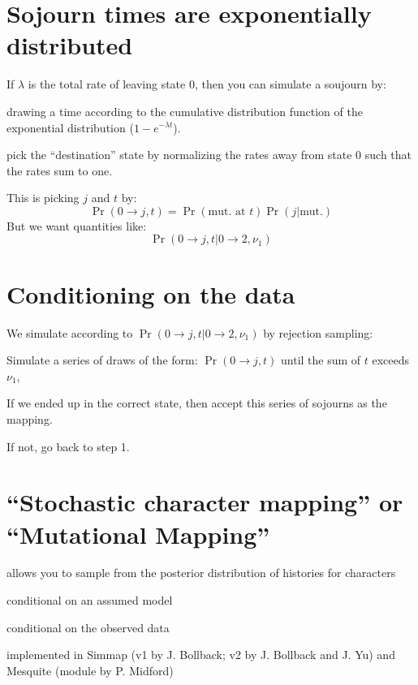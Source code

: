\documentclass[landscape]{foils}
\begin{document}
\myNewSlide


\myNewSlide
\section*{Sojourn times are exponentially distributed}
\large
If $\lambda$ is the total rate of leaving state $0$, then you can simulate a soujourn 
by:
\begin{compactitem}
	\item drawing a time according to the cumulative distribution function of the exponential distribution ($1 - e^{-\lambda t}$).
	\item pick the ``destination'' state by normalizing the rates away from state 0 such that the rates sum to one.
\end{compactitem}

This is picking $j$ and $t$ by:
\[\Pr(0\rightarrow j, t) = \Pr(\mbox{mut. at }t)\Pr(j|\mbox{mut.})\]
But we want quantities like:
\[\Pr(0\rightarrow j, t|0\rightarrow 2, \nu_1)\]

\myNewSlide
\section*{Conditioning on the data}
We simulate according to $\Pr(0\rightarrow j, t|0\rightarrow 2, \nu_1)$ by rejection sampling:
\begin{compactenum}
	\item Simulate a series of draws of the form: $\Pr(0\rightarrow j, t)$ until the sum of $t$ exceeds $\nu_1$,
	\item If we ended up in the correct state, then accept this series of sojourns as the mapping.
	\item If not, go back to step 1.
\end{compactenum}



\myNewSlide


\myNewSlide
\section*{``Stochastic character mapping'' or ``Mutational Mapping''}
\begin{compactitem}
	\item allows you to sample from the posterior distribution of histories for characters
	\item conditional on an assumed model
	\item conditional on the observed data
	\item implemented in Simmap (v1 by J. Bollback; v2 by J. Bollback and J. Yu) and Mesquite (module by P. Midford)
\end{compactitem}
\end{document}
